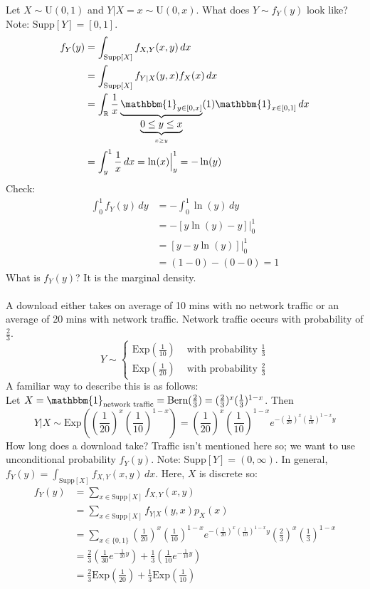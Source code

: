 \documentclass[12pt]{article}
\newcommand{\indicator}[1]{\mathbbm{1}_{#1}}
\newcommand{\suppx}{x \in \text{Supp}[X]}
\newcommand{\supp}[1]{\text{Supp}[ #1 ]}
\newcommand{\set}[1]{\Big\{ #1 \Big\}}
\begin{document}
Let $X \sim \text{U}(0,1)$ and $Y|X=x \sim \text{U}(0,x)$. What does $Y \sim f_Y(y)$ look like? Note: $\supp{Y} = [0,1]$. 
$$\begin{aligned} f_Y(y) &= \int_{\supp{X}} f_{X,Y}(x,y) \, dx \\ &= \int_{\supp{X}} f_{Y|X}(y,x)f_X(x)\, dx \\ &= \int_{\mathbb{R}} \frac{1}{x} \underbrace{\indicator{y \in [0,x]}}_{\underbrace{0 \leq y \leq x}_{x \geq y}} (1) \indicator{x \in [0,1]} \, dx \\ &= \int_y^1 \frac{1}{x} \, dx = \ln(x)\Big|_y^1 = -\ln(y) \end{aligned} $$ Check: $$ \begin{aligned} 
\int_0^1 f_Y(y) \,dy &= -\int_0^1 \ln(y) \, dy \\ &= -[y\ln(y) - y]\Big|_0^1 \\ &= [y - y\ln(y)]\Big|_0^1 \\ &= (1 - 0) - (0 - 0) = 1 \end{aligned} $$
What is $f_Y(y)$? It is the marginal density. \\~\\
A download either takes on average of 10 mins with no network traffic or an average of 20 mins with network traffic. Network traffic occurs with probability of $\frac{2}{3}$. 
$$ Y \sim \begin{cases} \text{Exp}(\frac{1}{10}) &\text{ with probability } \frac{1}{3} \\ \text{Exp}(\frac{1}{20}) &\text{ with probability } \frac{2}{3} \end{cases} $$ 
A familiar way to describe this is as follows: \\
Let $X = \indicator{\text{network traffic}} = \text{Bern}(\frac{2}{3}) = (\frac{2}{3})^x(\frac{1}{3})^{1-x}$. Then $$Y|X \sim \text{Exp}((\frac{1}{20})^x(\frac{1}{10})^{1 - x}) = (\frac{1}{20})^x(\frac{1}{10})^{1 - x}e^{-(\frac{1}{20})^x(\frac{1}{10})^{1-x}y} $$ 
How long does a download take? Traffic isn't mentioned here so; we want to use unconditional probability $f_Y(y)$. Note: $\supp{Y} = (0,\infty)$. In general, $f_Y(y) = \int_{\supp{X}} f_{X,Y}(x,y)\, dx $. Here, $X$ is discrete so: $$ \begin{aligned} f_Y(y) &= \sum_{\suppx} f_{X,Y}(x,y) \\ &= \sum_{\suppx} f_{Y|X}(y,x)p_X(x) \\ &= \sum_{x \in \set{0,1}} (\frac{1}{20})^x(\frac{1}{10})^{1-x}e^{-(\frac{1}{20})^x(\frac{1}{10})^{1-x}y} (\frac{2}{3})^x(\frac{1}{3})^{1-x} \\ &= \frac{2}{3}(\frac{1}{30}e^{-\frac{1}{20}y}) + \frac{1}{3}(\frac{1}{10}e^{-\frac{1}{10}y}) \\ &= \frac{2}{3}\text{Exp}(\frac{1}{20}) + \frac{1}{3}\text{Exp}(\frac{1}{10}) \end{aligned} $$ 
\end{document}
